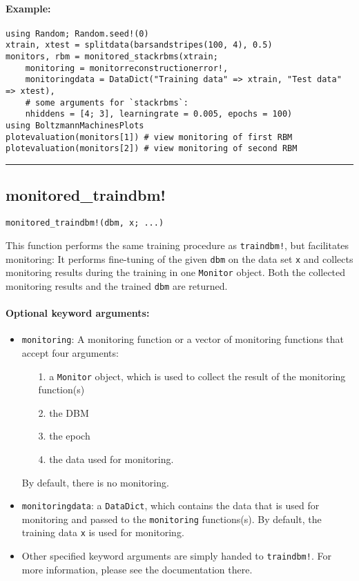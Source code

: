 \paragraph*{Example:}
\begin{verbatim}
using Random; Random.seed!(0)
xtrain, xtest = splitdata(barsandstripes(100, 4), 0.5)
monitors, rbm = monitored_stackrbms(xtrain;
    monitoring = monitorreconstructionerror!,
    monitoringdata = DataDict("Training data" => xtrain, "Test data" => xtest),
    # some arguments for `stackrbms`:
    nhiddens = [4; 3], learningrate = 0.005, epochs = 100)
using BoltzmannMachinesPlots
plotevaluation(monitors[1]) # view monitoring of first RBM
plotevaluation(monitors[2]) # view monitoring of second RBM
\end{verbatim}
\noindent\rule{\textwidth}{1pt}
\subsection*{monitored\_traindbm!}
\begin{verbatim}
monitored_traindbm!(dbm, x; ...)
\end{verbatim}
This function performs the same training procedure as \texttt{traindbm!}, but facilitates monitoring: It performs fine-tuning of the given \texttt{dbm} on the data set \texttt{x} and collects monitoring results during the training in one \texttt{Monitor} object. Both the collected monitoring results and the trained \texttt{dbm} are returned.

\paragraph*{Optional keyword arguments:}
\begin{itemize}
\item \texttt{monitoring}: A monitoring function or a vector of monitoring functions that accept four arguments:

\begin{itemize}
\item[1. ] a \texttt{Monitor} object, which is used to collect the result of the monitoring function(s)


\item[2. ] the DBM


\item[3. ] the epoch


\item[4. ] the data used for monitoring.

\end{itemize}
By default, there is no monitoring.


\item \texttt{monitoringdata}: a \texttt{DataDict}, which contains the data that is used for  monitoring and passed to the \texttt{monitoring} functions(s).  By default, the training data \texttt{x} is used for monitoring.


\item Other specified keyword arguments are simply handed to \texttt{traindbm!}. For more information, please see the documentation there.

\end{itemize}
